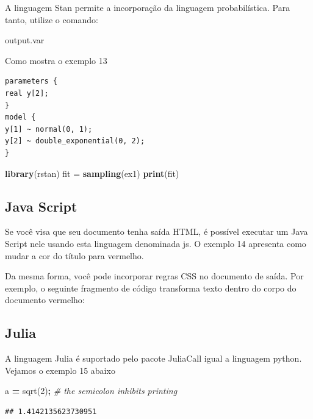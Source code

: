 \documentclass[
]{book}
\newenvironment{Shaded}{\begin{snugshade}}{\end{snugshade}}
\newcommand{\CommentTok}[1]{\textcolor[rgb]{0.56,0.35,0.01}{\textit{#1}}}
\newcommand{\FloatTok}[1]{\textcolor[rgb]{0.00,0.00,0.81}{#1}}
\newcommand{\KeywordTok}[1]{\textcolor[rgb]{0.13,0.29,0.53}{\textbf{#1}}}
\newcommand{\NormalTok}[1]{#1}
\newcommand{\OperatorTok}[1]{\textcolor[rgb]{0.81,0.36,0.00}{\textbf{#1}}}
\newcommand{\StringTok}[1]{\textcolor[rgb]{0.31,0.60,0.02}{#1}}
\begin{document}
A linguagem Stan permite a incorporação da linguagem probabilística. Para tanto, utilize o comando:

output.var

Como mostra o exemplo 13

\begin{verbatim}
parameters {
real y[2];
}
model {
y[1] ~ normal(0, 1);
y[2] ~ double_exponential(0, 2);
}
\end{verbatim}

\begin{Shaded}
\begin{Highlighting}[]
\KeywordTok{library}\NormalTok{(rstan)}
\NormalTok{fit =}\StringTok{ }\KeywordTok{sampling}\NormalTok{(ex1)}
\KeywordTok{print}\NormalTok{(fit)}
\end{Highlighting}
\end{Shaded}

\hypertarget{java-script}{%
\subsection{Java Script}\label{java-script}}

Se você visa que seu documento tenha saída HTML, é possível executar um Java Script nele usando esta linguagem denominada js.
O exemplo 14 apresenta como mudar a cor do título para vermelho.

Da mesma forma, você pode incorporar regras CSS no documento de saída. Por exemplo, o seguinte fragmento de código transforma
texto dentro do corpo do documento vermelho:

\hypertarget{julia}{%
\subsection{Julia}\label{julia}}

A linguagem Julia é suportado pelo pacote JuliaCall igual a linguagem python. Vejamos o exemplo 15 abaixo

\begin{Shaded}
\begin{Highlighting}[]
\NormalTok{a }\OperatorTok{=}\NormalTok{ sqrt(}\FloatTok{2}\NormalTok{)}\OperatorTok{;} \CommentTok{\# the semicolon inhibits printing}
\end{Highlighting}
\end{Shaded}

\begin{verbatim}
## 1.4142135623730951
\end{verbatim}
\end{document}

